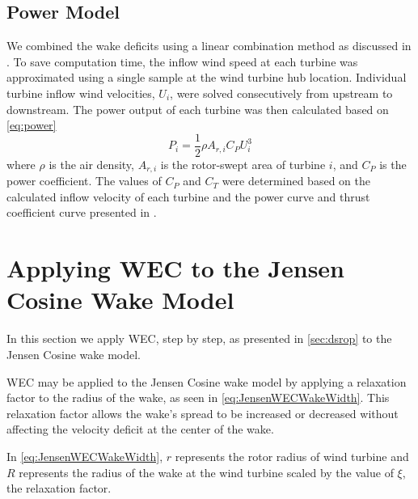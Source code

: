 \documentclass[a4paper]{jpconf}
\begin{document}
\subsection{Power Model}
We combined the wake deficits using a linear combination method as discussed in \cite{niayifar2016}. To save computation time, the inflow wind speed at each turbine was approximated using a single sample at the wind turbine hub location. Individual turbine inflow wind velocities, $U_i$, were solved consecutively from upstream to downstream. The power output of each turbine was then calculated based on \cref{eq:power}
%
\begin{equation}\label{eq:power}
P_i = \frac{1}{2}\rho A_{r,i}C_P U_i^3
\end{equation}
%
where $\rho$ is the air density, $A_{r,i}$ is the rotor-swept area of turbine $i$, and $C_P$ is the power coefficient. The values of $C_P$ and $C_T$ were determined based on the calculated inflow velocity of each turbine and the power curve and thrust coefficient curve presented in \cite{niayifar2016}.

\section{Applying WEC to the Jensen Cosine Wake Model}
In this section we apply WEC, step by step, as presented in \cref{sec:dsrop} to the Jensen Cosine wake model.  


WEC may be applied to the Jensen Cosine wake model by applying a relaxation factor to the radius of the wake, as seen in \cref{eq:JensenWECWakeWidth}. This relaxation factor allows the wake's spread to be increased or decreased without affecting the velocity deficit at the center of the wake.



In \cref{eq:JensenWECWakeWidth}, $r$ represents the rotor radius of wind turbine and $R$ represents the radius of the wake at the wind turbine scaled by the value of $\xi$, the relaxation factor.
\end{document}
